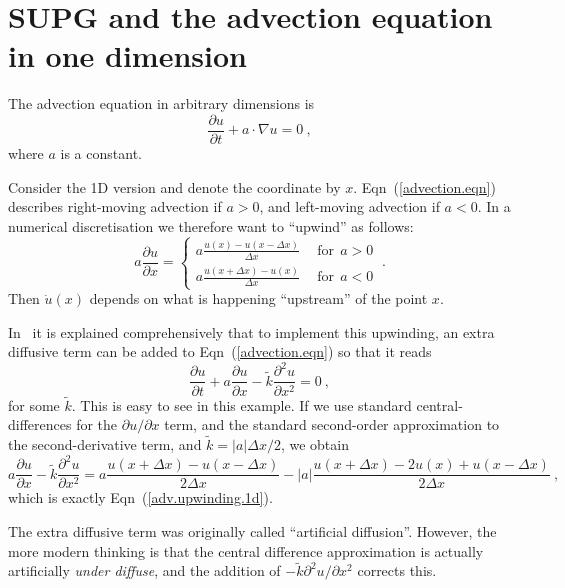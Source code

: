 \documentclass[]{scrreprt}
\begin{document}
\section{SUPG and the advection equation in one dimension}

The advection equation in arbitrary dimensions is
\begin{equation}
\frac{\partial u}{\partial t} + a\cdot\nabla u = 0 \ ,
\label{advection.eqn}
\end{equation}
where $a$ is a constant.

Consider the 1D version and denote the coordinate by $x$.
Eqn~(\ref{advection.eqn}) describes right-moving advection if $a>0$,
and left-moving advection if $a<0$.  In a numerical discretisation we
therefore want to ``upwind'' as follows:
\begin{equation}
a \frac{\partial u}{\partial x} = \left\{
\begin{array}{ll}
a \frac{u(x) - u(x-\Delta x)}{\Delta x} & \ \ \mbox{for}\ \ a>0 \\
a \frac{u(x+\Delta x) - u(x)}{\Delta x} & \ \ \mbox{for}\ \ a<0
\label{adv.upwinding.1d}
\end{array}
\right. \ .
\end{equation}
Then $\dot{u}(x)$ depends on what is happening ``upstream'' of the
point $x$.

In~\cite{brooks1982} it is explained comprehensively that to implement
this upwinding, an extra diffusive term can be added to
Eqn~(\ref{advection.eqn}) so that it reads
\begin{equation}
\frac{\partial u}{\partial t} + a\frac{\partial u}{\partial x} -
\tilde{k}\frac{\partial^{2} u}{\partial x^{2}} = 0 \ ,
\label{adv.upwinded.eqn}
\end{equation}
for some $\tilde{k}$.
This is easy to see in this example.  If we use standard
central-differences for the $\partial u/\partial x$ term, and the
standard second-order approximation to the second-derivative term, and
$\tilde{k} = |a|\Delta x/2$, we obtain
\begin{equation}
a\frac{\partial u}{\partial x} - \tilde{k}\frac{\partial^{2} u}{\partial x^{2}} =
a \frac{u(x+\Delta x) - u(x-\Delta x)}{2\Delta x} -
|a|\frac{u(x+\Delta x) - 2 u(x) + u(x - \Delta x)}{2\Delta x} \ ,
\end{equation}
which is exactly Eqn~(\ref{adv.upwinding.1d}).

The extra diffusive term was originally called ``artificial
diffusion''.  However, the more
modern thinking is that the central difference approximation is
actually artificially {\em under diffuse}, and the addition of
$-\tilde{k}{\partial^{2} u}/{\partial x^{2}}$ corrects this.
\end{document}
